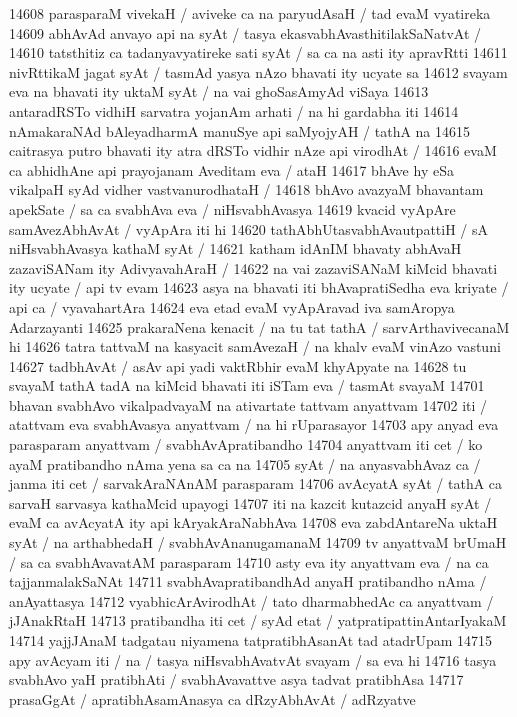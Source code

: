 14608 parasparaM vivekaH / aviveke ca na paryudAsaH / tad evaM vyatireka
14609 abhAvAd anvayo api na syAt / tasya ekasvabhAvasthitilakSaNatvAt / 
14610 tatsthitiz ca tadanyavyatireke sati syAt / sa ca na asti ity  apravRtti
14611 nivRttikaM jagat syAt / tasmAd yasya nAzo bhavati ity ucyate sa  
14612 svayam eva na bhavati ity uktaM syAt / na vai ghoSasAmyAd viSaya  
14613 antaradRSTo vidhiH sarvatra yojanAm arhati / na hi gardabha iti
14614 nAmakaraNAd bAleyadharmA manuSye api saMyojyAH / tathA na
14615 caitrasya putro bhavati ity atra dRSTo vidhir nAze api virodhAt / 
14616 evaM ca abhidhAne api prayojanam Aveditam eva / ataH  
14617 	bhAve hy eSa vikalpaH syAd vidher vastvanurodhataH /  
14618 bhAvo avazyaM bhavantam apekSate / sa ca svabhAva eva / niHsvabhAvasya 
14619 kvacid vyApAre samAvezAbhAvAt / vyApAra iti hi 
14620 tathAbhUtasvabhAvautpattiH / sA niHsvabhAvasya kathaM syAt /
14621 katham idAnIM bhavaty abhAvaH zazaviSANam ity AdivyavahAraH /  
14622 na vai zazaviSANaM kiMcid bhavati ity ucyate / api tv evam  
14623 asya na bhavati iti bhAvapratiSedha eva kriyate / api ca / vyavahartAra
14624 eva etad evaM vyApAravad iva samAropya Adarzayanti  
14625 prakaraNena kenacit / na tu tat tathA / sarvArthavivecanaM hi
14626 tatra tattvaM na kasyacit samAvezaH / na khalv evaM vinAzo vastuni
14627 tadbhAvAt / asAv api yadi vaktRbhir evaM khyApyate na 
14628 tu svayaM tathA tadA na kiMcid bhavati iti iSTam eva / tasmAt svayaM
14701 bhavan svabhAvo vikalpadvayaM na ativartate tattvam anyattvam  
14702 iti / atattvam eva svabhAvasya anyattvam / na hi rUparasayor  
14703 apy anyad eva parasparam anyattvam / svabhAvApratibandho
14704 anyattvam iti cet / ko ayaM pratibandho nAma yena sa ca na
14705 syAt / na anyasvabhAvaz ca / janma iti cet / sarvakAraNAnAM parasparam
14706 avAcyatA syAt / tathA ca sarvaH sarvasya kathaMcid upayogi
14707 iti na kazcit kutazcid anyaH syAt / evaM ca avAcyatA ity api kAryakAraNabhAva
14708 eva zabdAntareNa uktaH syAt / na arthabhedaH / svabhAvAnanugamanaM 
14709 tv anyattvaM brUmaH / sa ca svabhAvavatAM parasparam 
14710 asty eva ity anyattvam eva / na ca tajjanmalakSaNAt  
14711 svabhAvapratibandhAd anyaH pratibandho nAma / anAyattasya 
14712 vyabhicArAvirodhAt / tato dharmabhedAc ca anyattvam / jJAnakRtaH  
14713 pratibandha iti cet / syAd etat / yatpratipattinAntarIyakaM 
14714 yajjJAnaM tadgatau niyamena tatpratibhAsanAt tad atadrUpam  
14715 apy avAcyam iti / na / tasya niHsvabhAvatvAt svayam / sa eva hi  
14716 tasya svabhAvo yaH pratibhAti / svabhAvavattve asya tadvat pratibhAsa  
14717 prasaGgAt / apratibhAsamAnasya ca dRzyAbhAvAt / adRzyatve 
